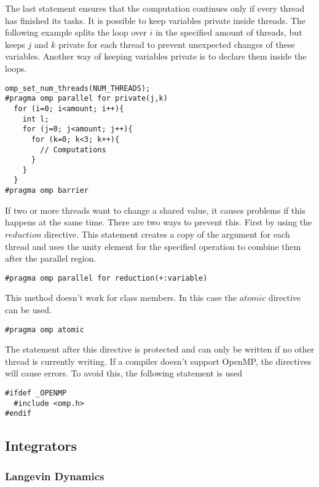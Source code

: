 \documentclass[a4paper]{article}
\begin{document}
The last statement ensures that the computation continues only if every thread has finished its tasks. It is possible to keep variables private inside threads. The following example splits the loop over $i$ in the specified amount of threads, but keeps $j$ and $k$ private for each thread to prevent unexpected changes of these variables. Another way of keeping variables private is to declare them inside the loops.

\begin{lstlisting}[caption={Example: OpenMP}, label={c:openmp}]
omp_set_num_threads(NUM_THREADS);
#pragma omp parallel for private(j,k)
  for (i=0; i<amount; i++){
    int l;
    for (j=0; j<amount; j++){
      for (k=0; k<3; k++){
        // Computations
      }
    }
  }
#pragma omp barrier
\end{lstlisting}

If two or more threads want to change a shared value, it causes problems if this happens at the same time. There are two ways to prevent this. First by using the $reduction$ directive. This statement creates a copy of the argument for each thread and uses the unity element for the specified operation to combine them after the parallel region. 

\begin{center}
\texttt{\#pragma omp parallel for reduction(+:variable)}
\end{center}

This method doesn't work for class members. In this case the $atomic$ directive can be used. 

\begin{center}
\texttt{\#pragma omp atomic}
\end{center}

The statement after this directive is protected and can only be written if no other thread is currently writing.
If a compiler doesn't support OpenMP, the directives will cause errors. To avoid this, the following statement is used

\begin{lstlisting}[caption={To avoid error messages if OpenMP is not installed}, label={c++:openmp_protection}]
#ifdef _OPENMP
  #include <omp.h>
#endif
\end{lstlisting}

\subsection{Integrators}

\subsubsection{Langevin Dynamics}
\end{document}
